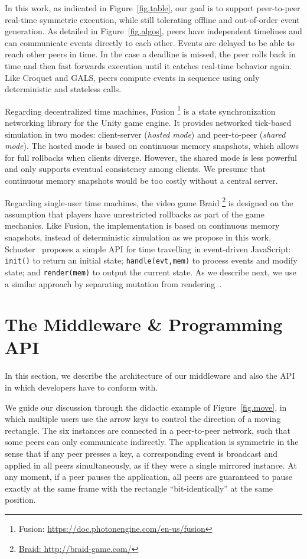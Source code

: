 \documentclass[10pt,journal,compsoc]{IEEEtran}
\newcommand{\code}[1]  {\texttt{\footnotesize{#1}}}
\begin{document}
In this work, as indicated in Figure~\ref{fig.table}, our goal is to support
peer-to-peer real-time symmetric execution, while still tolerating offline and
out-of-order event generation.
%
As detailed in Figure~\ref{fig.algos}, peers have independent timelines and
can communicate events directly to each other.
Events are delayed to be able to reach other peers in time.
In the case a deadline is missed, the peer rolls back in time and then fast
forwards execution until it catches real-time behavior again.
%
Like Croquet and GALS, peers compute events in sequence using only
deterministic and stateless calls.

Regarding decentralized time machines, Fusion%
\footnote{Fusion: \url{https://doc.photonengine.com/en-us/fusion}}
is a state synchronization networking library for the Unity game engine.
It provides networked tick-based simulation in two modes: client-server
(\emph{hosted mode}) and peer-to-peer (\emph{shared mode}).
The hosted mode is based on continuous memory snapshots, which allows for
full rollbacks when clients diverge.
However, the shared mode is less powerful and only supports eventual
consistency among clients.
We presume that continuous memory snapshots would be too costly without a
central server.

Regarding single-user time machines, the video game Braid%
\footnote{\url{Braid: http://braid-game.com/}}
is designed on the assumption that players have unrestricted rollbacks as part
of the game mechanics.
Like Fusion, the implementation is based on continuous memory snapshots,
instead of deterministic simulation as we propose in this work.
%
Schuster~\cite{tml.js} proposes a simple API for time travelling in
event-driven JavaScript:
    \code{init()} to return an initial state;
    \code{handle(evt,mem)} to process events and modify state; and
    \code{render(mem)} to output the current state.
As we describe next, we use a similar approach by separating mutation from
rendering~\cite{tml.alive}.

\section{The Middleware \& Programming API}
\label{sec.tml}

In this section, we describe the architecture of our middleware and also the
API in which developers have to conform with.

We guide our discussion through the didactic example of Figure~\ref{fig.move},
in which multiple users use the arrow keys to control the direction of a
moving rectangle.
The six instances are connected in a peer-to-peer network, such that some
peers can only communicate indirectly.
%
The application is symmetric in the sense that if any peer presses a key, a
corresponding event is broadcast and applied in all peers simultaneously, as
if they were a single mirrored instance.
At any moment, if a peer pauses the application, all peers are guaranteed to
pause exactly at the same frame with the rectangle ``bit-identically'' at the
same position.
\end{document}
